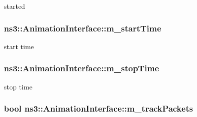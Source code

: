 started 

\subsubsection[{\texorpdfstring{m\+\_\+start\+Time}{m_startTime}}]{ ns3\+::\+Animation\+Interface\+::m\+\_\+start\+Time\hspace{0.3cm}{\ttfamily [private]}}\hypertarget{classns3_1_1AnimationInterface_aca75b39a0e49369b5fb57c0d665f19e0}{}\label{classns3_1_1AnimationInterface_aca75b39a0e49369b5fb57c0d665f19e0}


start time 

\subsubsection[{\texorpdfstring{m\+\_\+stop\+Time}{m_stopTime}}]{ ns3\+::\+Animation\+Interface\+::m\+\_\+stop\+Time\hspace{0.3cm}{\ttfamily [private]}}\hypertarget{classns3_1_1AnimationInterface_a641bd6d111b12ce588debb0104bbe6c8}{}\label{classns3_1_1AnimationInterface_a641bd6d111b12ce588debb0104bbe6c8}


stop time 

\subsubsection[{\texorpdfstring{m\+\_\+track\+Packets}{m_trackPackets}}]{\setlength{\rightskip}{0pt plus 5cm}bool ns3\+::\+Animation\+Interface\+::m\+\_\+track\+Packets\hspace{0.3cm}{\ttfamily [private]}}\hypertarget{classns3_1_1AnimationInterface_a941564ffa2215ad2d7ef25cb36549368}{}\label{classns3_1_1AnimationInterface_a941564ffa2215ad2d7ef25cb36549368}


